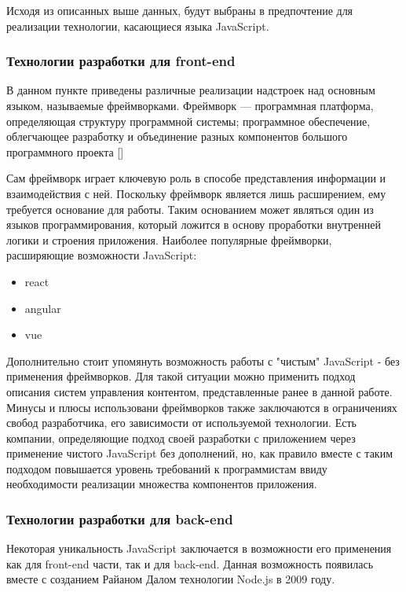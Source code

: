         Исходя из описанных выше данных, будут выбраны в предпочтение для реализации технологии, касающиеся языка JavaScript.

    \subsubsection{Технологии разработки для front-end}
        В данном пункте приведены различные реализации надстроек над основным языком, называемые фреймворками.
        Фреймворк — программная платформа, определяющая структуру программной системы; программное обеспечение, облегчающее разработку и объединение разных компонентов большого программного проекта [] %
        
        Сам фреймворк играет ключевую роль в способе представления информации и взаимодействия с ней.
        Поскольку фреймворк является лишь расширением, ему требуется основание для работы.
        Таким основанием может являться один из языков программирования, который ложится в основу проработки внутренней логики и строения приложения.
        Наиболее популярные фреймворки, расширяющие возможности JavaScript:
        \begin{itemize}
            \item react
            \item angular
            \item vue
        \end{itemize}
        Дополнительно стоит упомянуть возможность работы с "чистым" JavaScript - без применения фреймворков.
        Для такой ситуации можно применить подход описания систем управления контентом, представленные ранее в данной работе.
        Минусы и плюсы использовани фреймворков также заключаются в ограничениях свобод разработчика, его зависимости от используемой технологии.
        Есть компании, определяющие подход своей разработки с приложением через применение чистого JavaScript без дополнений, но, как правило вместе с таким подходом повышается уровень требований к программистам ввиду необходимости реализации множества компонентов приложения.

    \subsubsection{Технологии разработки для back-end}
        Некоторая уникальность JavaScript заключается в возможности его применения как для front-end части, так и для back-end.
        Данная возможность появилась вместе с созданием Райаном Далом технологии Node.js в 2009 году.

